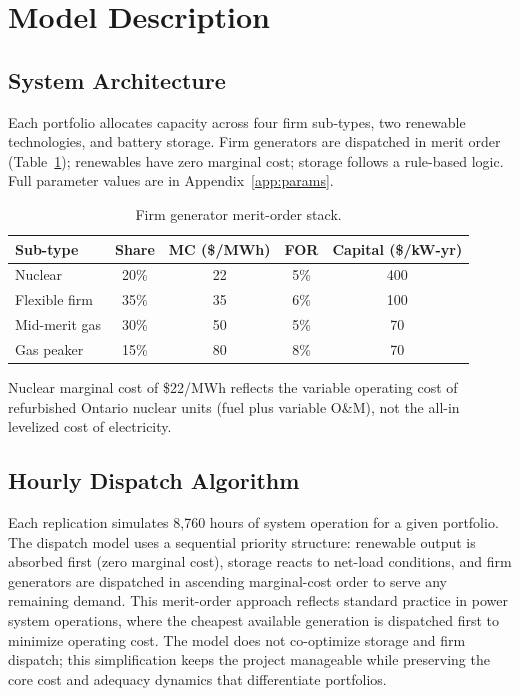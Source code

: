 \documentclass[11pt]{article}
\begin{document}
\section{Model Description}\label{sec:model}

\subsection{System Architecture}

Each portfolio allocates capacity across four firm sub-types, two renewable technologies, and battery storage. Firm generators are dispatched in merit order (Table~\ref{tab:merit}); renewables have zero marginal cost; storage follows a rule-based logic. Full parameter values are in Appendix~\ref{app:params}.

\begin{table}[h]
\centering
\caption{Firm generator merit-order stack.}\label{tab:merit}
\begin{tabular}{lcccc}
\toprule
Sub-type & Share & MC (\$/MWh) & FOR & Capital (\$/kW-yr) \\
\midrule
Nuclear       & 20\% & 22 & 5\% & 400 \\
Flexible firm & 35\% & 35 & 6\% & 100 \\
Mid-merit gas & 30\% & 50 & 5\% & 70 \\
Gas peaker    & 15\% & 80 & 8\% & 70 \\
\bottomrule
\end{tabular}
\end{table}

Nuclear marginal cost of \$22/MWh reflects the variable operating cost of refurbished Ontario nuclear units (fuel plus variable O\&M), not the all-in levelized cost of electricity.

\subsection{Hourly Dispatch Algorithm}

Each replication simulates 8,760 hours of system operation for a given portfolio. The dispatch model uses a sequential priority structure: renewable output is absorbed first (zero marginal cost), storage reacts to net-load conditions, and firm generators are dispatched in ascending marginal-cost order to serve any remaining demand. This merit-order approach reflects standard practice in power system operations, where the cheapest available generation is dispatched first to minimize operating cost. The model does not co-optimize storage and firm dispatch; this simplification keeps the project manageable while preserving the core cost and adequacy dynamics that differentiate portfolios.
\end{document}
